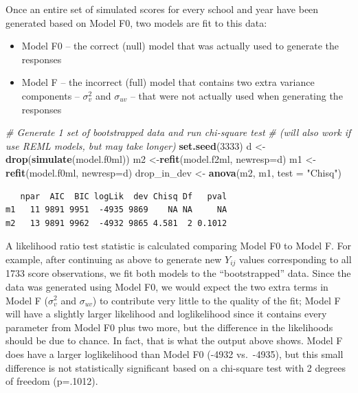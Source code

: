 \documentclass[
]{krantz}
\newenvironment{Shaded}{\begin{snugshade}}{\end{snugshade}}
\newcommand{\CommentTok}[1]{\textcolor[rgb]{0.37,0.37,0.37}{\textit{#1}}}
\newcommand{\DataTypeTok}[1]{\textcolor[rgb]{0.27,0.27,0.27}{#1}}
\newcommand{\DecValTok}[1]{\textcolor[rgb]{0.06,0.06,0.06}{#1}}
\newcommand{\KeywordTok}[1]{\textcolor[rgb]{0.27,0.27,0.27}{\textbf{#1}}}
\newcommand{\NormalTok}[1]{#1}
\newcommand{\StringTok}[1]{\textcolor[rgb]{0.5,0.5,0.5}{#1}}
\providecommand{\tightlist}{%
  \setlength{\itemsep}{0pt}\setlength{\parskip}{0pt}}
\begin{document}
Once an entire set of simulated scores for every school and year have been generated based on Model F0, two models are fit to this data:

\begin{itemize}
\tightlist
\item
  Model F0 -- the correct (null) model that was actually used to generate the responses
\item
  Model F -- the incorrect (full) model that contains two extra variance components -- \(\sigma_{v}^{2}\) and \(\sigma_{uv}\) -- that were not actually used when generating the responses
\end{itemize}

\begin{Shaded}
\begin{Highlighting}[]
\CommentTok{# Generate 1 set of bootstrapped data and run chi-square test}
\CommentTok{#  (will also work if use REML models, but may take longer)}
\KeywordTok{set.seed}\NormalTok{(}\DecValTok{3333}\NormalTok{)}
\NormalTok{d <-}\StringTok{ }\KeywordTok{drop}\NormalTok{(}\KeywordTok{simulate}\NormalTok{(model.f0ml))}
\NormalTok{m2 <-}\KeywordTok{refit}\NormalTok{(model.f2ml, }\DataTypeTok{newresp=}\NormalTok{d)}
\NormalTok{m1 <-}\KeywordTok{refit}\NormalTok{(model.f0ml, }\DataTypeTok{newresp=}\NormalTok{d)}
\NormalTok{drop_in_dev <-}\StringTok{ }\KeywordTok{anova}\NormalTok{(m2, m1, }\DataTypeTok{test =} \StringTok{"Chisq"}\NormalTok{)}
\end{Highlighting}
\end{Shaded}

\begin{verbatim}
   npar  AIC  BIC logLik  dev Chisq Df   pval
m1   11 9891 9951  -4935 9869    NA NA     NA
m2   13 9891 9962  -4932 9865 4.581  2 0.1012
\end{verbatim}

A likelihood ratio test statistic is calculated comparing Model F0 to Model F. For example, after continuing as above to generate new \(Y_{ij}\) values corresponding to all 1733 score observations, we fit both models to the ``bootstrapped'' data. Since the data was generated using Model F0, we would expect the two extra terms in Model F (\(\sigma^2_{v}\) and \(\sigma_{uv}\)) to contribute very little to the quality of the fit; Model F will have a slightly larger likelihood and loglikelihood since it contains every parameter from Model F0 plus two more, but the difference in the likelihoods should be due to chance. In fact, that is what the output above shows. Model F does have a larger loglikelihood than Model F0 (-4932 vs.~-4935), but this small difference is not statistically significant based on a chi-square test with 2 degrees of freedom (p=.1012).
\end{document}
